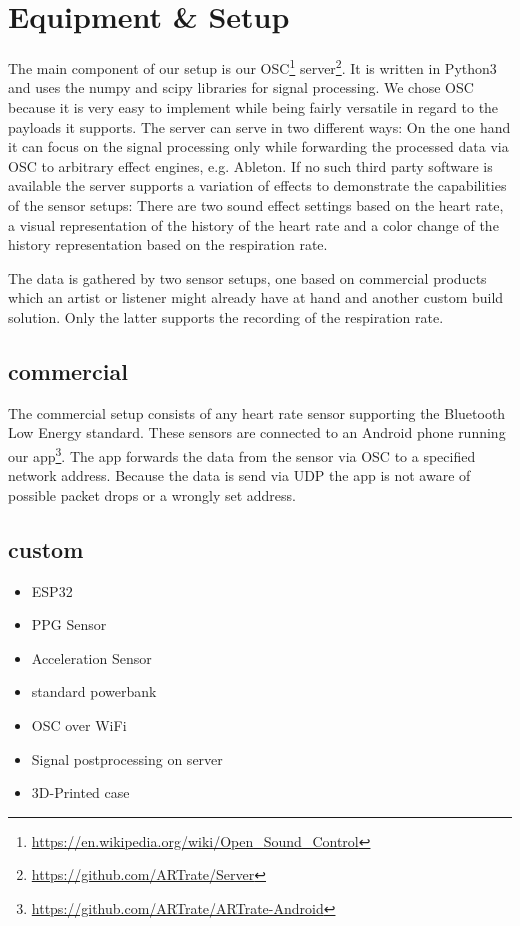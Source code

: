 \documentclass{sigchi-ext}
\begin{document}
\section{Equipment \& Setup}

The main component of our setup is our OSC\footnote{\url{https://en.wikipedia.org/wiki/Open_Sound_Control}}
server\footnote{\url{https://github.com/ARTrate/Server}}. It is written in Python3 and uses the numpy and
scipy libraries for signal processing.
We chose OSC because it is very easy to implement while being fairly versatile in regard to
the payloads it supports. The server can serve in two different ways: On the one hand it can
focus on the signal processing only while forwarding the processed data via OSC to arbitrary
effect engines, e.g. Ableton. If no such third party software is available the server supports
a variation of effects to demonstrate the capabilities of the sensor setups: There are two sound
effect settings based on the heart rate, a visual representation of the history of the heart rate
and a color change of the history representation based on the respiration rate. %

The data is gathered by two sensor setups, one based on commercial products which an artist or
listener might already have at hand and another custom build solution. Only the latter supports
the recording of the respiration rate.

\subsection{commercial}

The commercial setup consists of any heart rate sensor supporting the Bluetooth Low Energy
standard. These sensors are connected to an Android phone running our app\footnote{\url{https://github.com/ARTrate/ARTrate-Android}}.
The app forwards the data from the sensor via OSC to a specified network address. Because
the data is send via UDP the app is not aware of possible packet drops or a wrongly set address.

\subsection{custom}
\begin{itemize}
  \item ESP32
  \item PPG Sensor
  \item Acceleration Sensor
  \item standard powerbank
  \item OSC over WiFi
  \item Signal postprocessing on server
  \item 3D-Printed case
\end{itemize}
\end{document}
